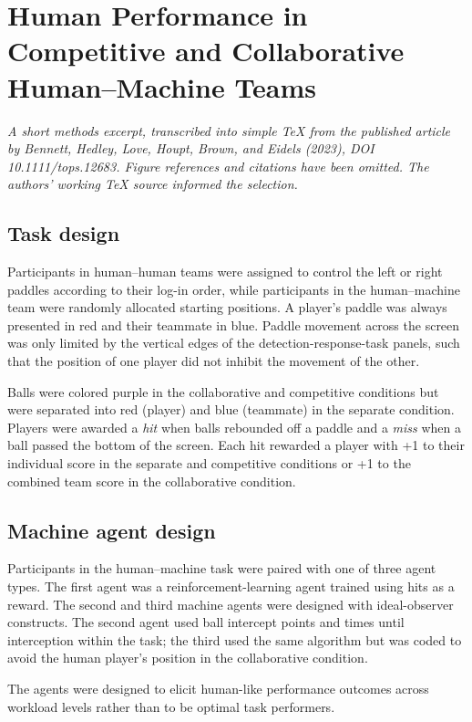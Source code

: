 \section{Human Performance in Competitive and Collaborative Human--Machine Teams}

\emph{A short methods excerpt, transcribed into simple TeX from the published article by Bennett, Hedley, Love, Houpt, Brown, and Eidels (2023), DOI 10.1111/tops.12683. Figure references and citations have been omitted. The authors' working TeX source informed the selection.}

\subsection{Task design}

Participants in human--human teams were assigned to control the left or right paddles according to their log-in order, while participants in the human--machine team were randomly allocated starting positions. A player's paddle was always presented in red and their teammate in blue. Paddle movement across the screen was only limited by the vertical edges of the detection-response-task panels, such that the position of one player did not inhibit the movement of the other.

Balls were colored purple in the collaborative and competitive conditions but were separated into red (player) and blue (teammate) in the separate condition. Players were awarded a \textit{hit} when balls rebounded off a paddle and a \textit{miss} when a ball passed the bottom of the screen. Each hit rewarded a player with +1 to their individual score in the separate and competitive conditions or +1 to the combined team score in the collaborative condition.

\subsection{Machine agent design}

Participants in the human--machine task were paired with one of three agent types. The first agent was a reinforcement-learning agent trained using hits as a reward. The second and third machine agents were designed with ideal-observer constructs. The second agent used ball intercept points and times until interception within the task; the third used the same algorithm but was coded to avoid the human player's position in the collaborative condition.

The agents were designed to elicit human-like performance outcomes across workload levels rather than to be optimal task performers.
